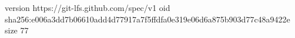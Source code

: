 version https://git-lfs.github.com/spec/v1
oid sha256:e006a3dd7b06610add4d77917a7f5ffdfa0e319e06d6a875b903d77c48a9422e
size 77
